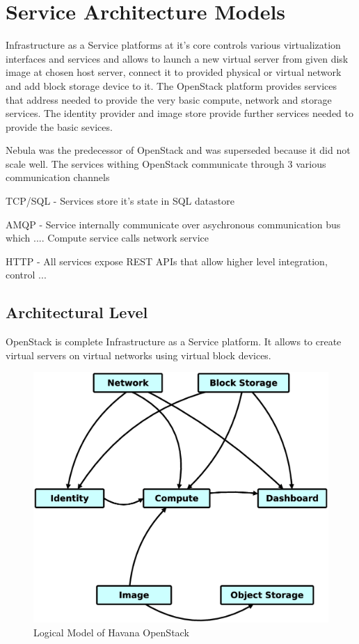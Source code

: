 
\section{Service Architecture Models}

Infrastructure as a Service platforms at it's core controls various virtualization interfaces and services and allows to launch a new virtual server from given disk image at chosen host server, connect it to provided physical or virtual network and add block storage device to it. The OpenStack platform provides services that address needed to provide the very basic compute, network and storage services. The identity provider and image store  provide further services needed to provide the basic sevices.

Nebula was the predecessor of OpenStack and was superseded because it did not scale well. The services withing OpenStack communicate through 3 various communication channels

TCP/SQL - Services store it's state in SQL datastore

AMQP - Service internally communicate over asychronous communication bus which .... Compute service calls network service 

HTTP - All services expose REST APIs that allow higher level integration, control ...

\subsection{Architectural Level}

OpenStack is complete Infrastructure as a Service platform. It allows to create virtual servers on virtual networks using virtual block devices.


\begin{figure}[!h]
\centering
\includegraphics[scale=.2]{img/openstack_logical_model.eps}
\caption{Logical Model of Havana OpenStack}
\label{fig:cm}
\end{figure}

